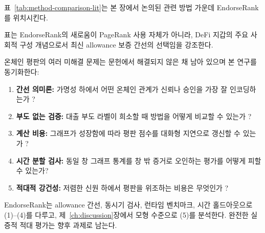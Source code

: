 
표~\ref{tab:method-comparison-lit}는 본 장에서 논의된 관련 방법 가운데 EndorseRank를 위치시킨다.

\begin{table}[htbp]
\centering
\caption{선택된 그래프 평판 방법의 비교(개념적).}
\label{tab:method-comparison-lit}
\end{table}

표는 EndorseRank의 새로움이 PageRank 사용 자체가 아니라, DeFi 지갑의 주요 사회적 구성 개념으로서 최신 allowance 보증 간선의 선택임을 강조한다.


온체인 평판의 여러 미해결 문제는 문헌에서 해결되지 않은 채 남아 있으며 본 연구를 동기화한다:

\begin{enumerate}
\item \textbf{간선 의미론:} 가명성 하에서 어떤 온체인 관계가 신뢰나 승인을 가장 잘 인코딩하는가 ?
\item \textbf{부도 없는 검증:} 대출 부도 라벨이 희소할 때 방법을 어떻게 비교할 수 있는가 ?
\item \textbf{계산 비용:} 그래프가 성장함에 따라 평판 점수를 대화형 지연으로 갱신할 수 있는가 ?
\item \textbf{시간 분할 검사:} 동일 창 그래프 통계를 창 밖 증거로 오인하는 평가를 어떻게 피할 수 있는가?
\item \textbf{적대적 강건성:} 저렴한 신원 하에서 평판을 위조하는 비용은 무엇인가 ?
\end{enumerate}

EndorseRank는 allowance 간선, 동시기 검사, 런타임 벤치마크, 시간 홀드아웃으로 (1)--(4)를 다루고, 제~\ref{ch:discussion}장에서 모형 수준으로 (5)를 분석한다. 완전한 실증적 적대 평가는 향후 과제로 남는다.
